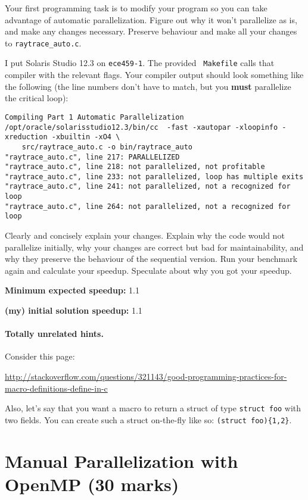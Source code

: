 \documentclass[letterpaper,10pt]{article}
\begin{document}
Your first programming task is to modify your program so you can take
advantage of automatic parallelization. Figure out why it won't
parallelize as is, and make any changes necessary. Preserve behaviour
and make all your changes to {\tt raytrace\_auto.c}.

I put Solaris Studio 12.3 on {\tt ece459-1}. The provided {\tt
  Makefile} calls that compiler with the relevant flags. Your compiler
output should look something like the following (the line numbers
don't have to match, but you {\bf must} parallelize the critical loop):

\newpage
\begin{lstlisting}
Compiling Part 1 Automatic Parallelization
/opt/oracle/solarisstudio12.3/bin/cc  -fast -xautopar -xloopinfo -xreduction -xbuiltin -xO4 \
    src/raytrace_auto.c -o bin/raytrace_auto
"raytrace_auto.c", line 217: PARALLELIZED
"raytrace_auto.c", line 218: not parallelized, not profitable
"raytrace_auto.c", line 233: not parallelized, loop has multiple exits
"raytrace_auto.c", line 241: not parallelized, not a recognized for loop
"raytrace_auto.c", line 264: not parallelized, not a recognized for loop
\end{lstlisting}

Clearly and concisely explain your changes. Explain why the code would
not parallelize initially, why your changes are correct but bad for
maintainability, and why they preserve the behaviour of the sequential
version. Run your benchmark again and calculate your
speedup. Speculate about why you got your speedup.

\squishlist
  \item {\bf Minimum expected speedup:} 1.1
  \item {\bf (my) initial solution speedup:} 1.1
\squishend

\paragraph{Totally unrelated hints.} Consider this page:
\begin{center}
  \scriptsize \url{http://stackoverflow.com/questions/321143/good-programming-practices-for-macro-definitions-define-in-c}
\end{center}
Also, let's say that you want a macro to return a struct of type {\tt struct foo} with
two fields. You can create such a struct on-the-fly like so: \verb!(struct foo){1,2}!.

\section*{Manual Parallelization with OpenMP (30 marks)}
\end{document}
